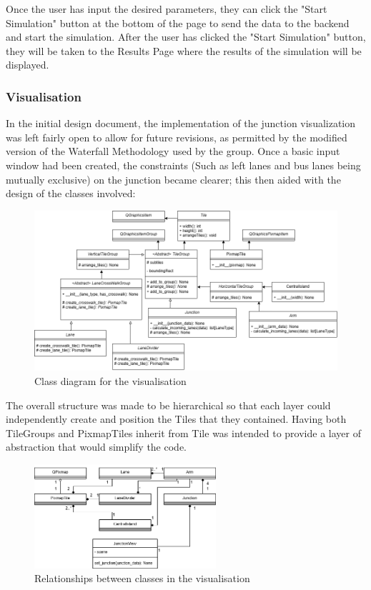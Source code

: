 \documentclass{article}
\begin{document}
    Once the user has input the desired parameters, they can click the "Start Simulation" button at the bottom of the page to send the data to the backend and start the simulation. After the user has clicked the "Start Simulation" button, they
    will be taken to the Results Page where the results of the simulation will be displayed.

    \subsubsection{Visualisation}
        In the initial design document, the implementation of the junction visualization was left fairly open to allow for future revisions, as permitted by the
        modified version of the Waterfall Methodology used by the group. Once a basic input window had been created, the constraints (Such as left lanes and bus
        lanes being mutually exclusive) on the junction became clearer; this then aided with the design of the classes involved:
        \begin{figure}[H]
            \centering
            \includegraphics[width=\textwidth]{visualisation_class}
            \caption{Class diagram for the visualisation}
            \label{fig:visualisation_class}
        \end{figure}
        The overall structure was made to be hierarchical so that each layer could independently create and position the Tiles that they contained. Having both
        TileGroups and PixmapTiles inherit from Tile was intended to provide a layer of abstraction that would simplify the code.
        \begin{figure}[H]
            \centering
            \includegraphics[width=0.6\textwidth]{visualisation_relationship}
            \caption{Relationships between classes in the visualisation}
            \label{fig:visualisation_relationship}
        \end{figure}
\end{document}
